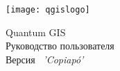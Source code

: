 
\begin{titlepage}
\begin{center}

\begin{center}
\texttt{[image: qgislogo]}
\end{center}

\Huge{Quantum GIS}\\
\vspace{0.5cm}
\Large{Руководство пользователя} \\
\vspace{0.5cm}
\Large{Версия ~\CURRENT \textsl{'Copiapó'}}

\end{center}
\end{titlepage}
